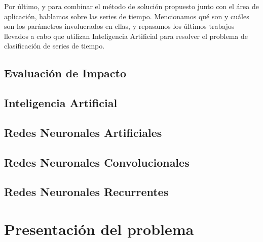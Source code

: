 \documentclass[a4paper,12pt,spanish]{book}
\begin{document}
Por último, y para combinar el método de solución propuesto junto con el área de
aplicación, hablamos sobre las series de tiempo. Mencionamos qué son y cuáles son los
parámetros involucrados en ellas, y repasamos los últimos trabajos llevados a cabo que
utilizan Inteligencia Artificial para resolver el problema de clasificación de series de
tiempo.

\section{Evaluación de Impacto}


\section{Inteligencia Artificial}


\section{Redes Neuronales Artificiales}



\section{Redes Neuronales Convolucionales}


\section{Redes Neuronales Recurrentes}


% 


\chapter{Presentación del problema} \label{sec:problema}

\end{document}

